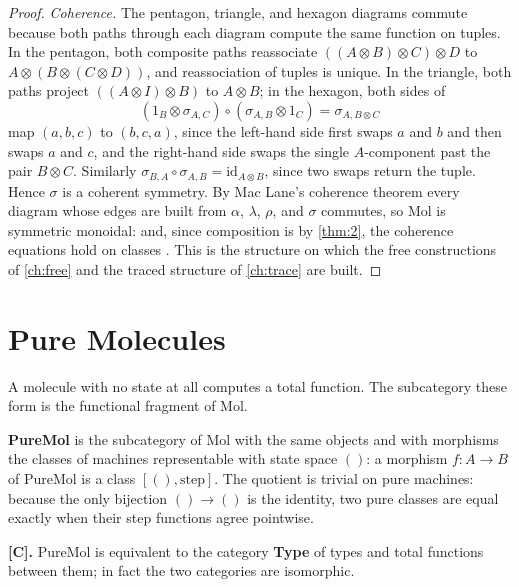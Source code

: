 \begin{proof}
\emph{Coherence.} The pentagon, triangle, and hexagon diagrams commute
because both paths through each diagram compute the same function on tuples.
In the pentagon, both composite paths reassociate
$((A \otimes B) \otimes C) \otimes D$ to
$A \otimes (B \otimes (C \otimes D))$, and reassociation of tuples is unique.
In the triangle, both paths project $((A \otimes I) \otimes B)$ to
$A \otimes B$; in the hexagon, both sides of
\[ (1_B \otimes \sigma_{A,C}) \circ (\sigma_{A,B} \otimes 1_C)
   = \sigma_{A,B \otimes C} \]
map $(a, b, c)$ to $(b, c, a)$, since the left-hand side first swaps $a$ and
$b$ and then swaps $a$ and $c$, and the right-hand side swaps the single
$A$-component past the pair $B \otimes C$. Similarly
$\sigma_{B,A} \circ \sigma_{A,B} = \mathrm{id}_{A \otimes B}$, since two
swaps return the tuple. Hence $\sigma$ is a coherent symmetry. By Mac Lane's
coherence theorem every diagram whose edges are built from $\alpha$, $\lambda$,
$\rho$, and $\sigma$ commutes, so Mol is symmetric monoidal: and, since
composition is by \autoref{thm:2}, the coherence equations hold on classes
\citep{maclane}. This is the structure on which the free constructions of
\autoref{ch:free} and the traced structure of \autoref{ch:trace} are built.
\end{proof}

\section{Pure Molecules}\label{sec:mol-pure}

A molecule with no state at all computes a total function. The subcategory
these form is the functional fragment of Mol.

\begin{definition}[PureMol]\label{def:puremol}
\textbf{PureMol} is the subcategory of Mol with the same objects and with
morphisms the classes of machines representable with state space $()$: a
morphism $f : A \to B$ of PureMol is a class $[(), \mathrm{step}]$. The
quotient is trivial on pure machines: because the only bijection
$() \to ()$ is the identity, two pure classes are equal exactly when their
step functions agree pointwise.
\end{definition}

\begin{theorem}\label{thm:4}
\textbf{[C].} PureMol is equivalent to the category \textbf{Type} of types
and total functions between them; in fact the two categories are isomorphic.
\end{theorem}

